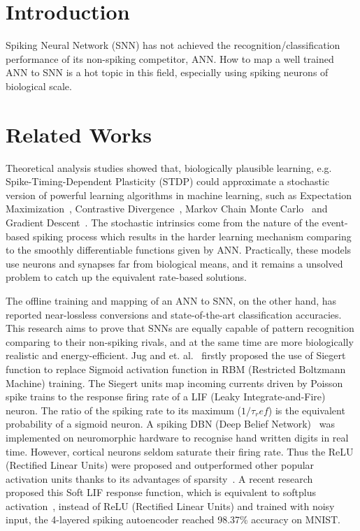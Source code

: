 \documentclass[runningheads,a4paper]{llncs}
\begin{document}
\section{Introduction}
Spiking Neural Network (SNN) has not achieved the recognition/classification performance of its non-spiking competitor, ANN.
How to map a well trained ANN to SNN is a hot topic in this field, especially using spiking neurons of biological scale.
\section{Related Works}
Theoretical analysis studies showed that, biologically plausible learning, e.g. Spike-Timing-Dependent Plasticity (STDP) could approximate a stochastic version of powerful learning algorithms in machine learning, such as Expectation Maximization~\cite{nessler2013bayesian}, Contrastive Divergence~\cite{neftci2013event}, Markov Chain Monte Carlo~\cite{buesing2011neural} and Gradient Descent~\cite{o2016deep}.
The stochastic intrinsics come from the nature of the event-based spiking process which results in the harder learning mechanism comparing to the smoothly differentiable functions given by ANN.
Practically, these models use neurons and synapses far from biological means, and it remains a unsolved problem to catch up the equivalent rate-based solutions.
 
The offline training and mapping of an ANN to SNN, on the other hand, has reported near-lossless conversions and state-of-the-art classification accuracies.
This research aims to prove that SNNs are equally capable of pattern recognition comparing to their non-spiking rivals, and at the same time are more biologically realistic and energy-efficient.
Jug and et. al.~\cite{Jug_etal_2012} firstly proposed the use of Siegert function to replace Sigmoid activation function in RBM (Restricted Boltzmann Machine) training.
The Siegert units map incoming currents driven by Poisson spike trains to the response firing rate of a LIF (Leaky Integrate-and-Fire) neuron.
The ratio of the spiking rate to its maximum ($1/\tau_ref$) is the equivalent probability of a sigmoid neuron.
A spiking DBN (Deep Belief Network)~\cite{o2013real} was implemented on neuromorphic hardware to recognise hand written digits in real time.
However, cortical neurons seldom saturate their firing rate.
Thus the ReLU (Rectified Linear Units) were proposed and outperformed other popular activation units thanks to its advantages of sparsity~\cite{glorot2011deep}.
A recent research~\cite{hunsberger2015spiking} proposed this Soft LIF response function, which is equivalent to softplus activation~\cite{dugas2001incorporating}, instead of ReLU (Rectified Linear Units) and trained with noisy input, the 4-layered spiking autoencoder reached 98.37\% accuracy on MNIST. 
\end{document}
